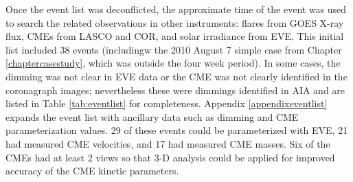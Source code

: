 Once the event list was deconflicted, the approximate time of the event was used to search the related observations in other instruments: flares from GOES X-ray flux, CMEs from LASCO and COR, and solar irradiance from EVE. This initial list included 38 events (includingw the 2010 August 7 simple case from Chapter \ref{chaptercasestudy}, which was outside the four week period). In some cases, the dimming was not clear in EVE data or the CME was not clearly identified in the coronagraph images; nevertheless these were dimmings identified in AIA and are listed in Table \ref{tab:eventlist} for completeness. Appendix \ref{appendixeventlist} expands the event list with ancillary data such as dimming and CME parameterization values. 29 of these events could be parameterized with EVE, 21 had measured CME velocities, and 17 had measured CME masses. Six of the CMEs had at least 2 views so that 3-D analysis could be applied for improved accuracy of the CME kinetic parameters.


